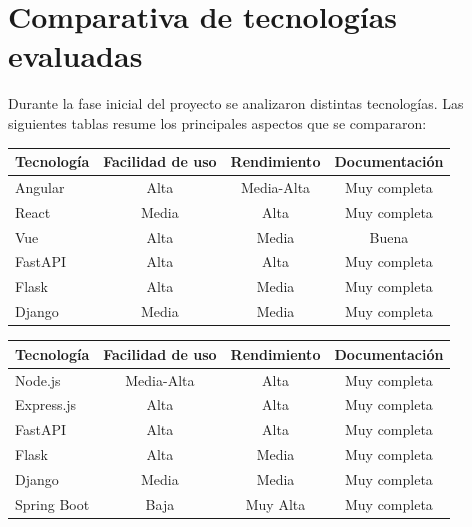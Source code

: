 \section{Comparativa de tecnologías evaluadas}

Durante la fase inicial del proyecto se analizaron distintas tecnologías. Las siguientes tablas resume los principales aspectos que se compararon:

\begin{center}
\begin{tabular}{|l|c|c|c|}
\hline
\textbf{Tecnología} & \textbf{Facilidad de uso} & \textbf{Rendimiento} & \textbf{Documentación} \\
\hline
Angular & Alta & Media-Alta & Muy completa \\
React & Media & Alta & Muy completa \\
Vue & Alta & Media & Buena \\
FastAPI & Alta & Alta & Muy completa \\
Flask & Alta & Media & Muy completa \\
Django & Media & Media & Muy completa \\
\hline
\end{tabular}
\end{center}

\begin{center}
\begin{tabular}{|l|c|c|c|}
\hline
\textbf{Tecnología} & \textbf{Facilidad de uso} & \textbf{Rendimiento} & \textbf{Documentación} \\
\hline
Node.js & Media-Alta & Alta & Muy completa \\
Express.js & Alta & Alta & Muy completa \\
FastAPI & Alta & Alta & Muy completa \\
Flask & Alta & Media & Muy completa \\
Django & Media & Media & Muy completa \\
Spring Boot & Baja & Muy Alta & Muy completa \\
\hline
\end{tabular}
\end{center}


